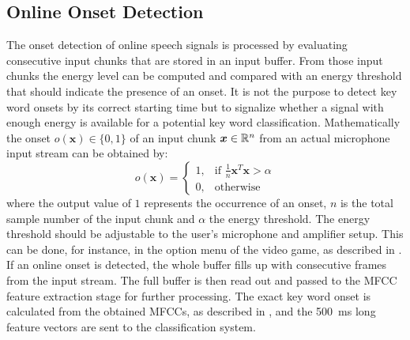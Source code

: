 
\subsection{Online Onset Detection}\label{sec:signal_onset_online}
The onset detection of online speech signals is processed by evaluating consecutive input chunks that are stored in an input buffer.
From those input chunks the energy level can be computed and compared with an energy threshold that should indicate the presence of an onset.
It is not the purpose to detect key word onsets by its correct starting time but to signalize whether a signal with enough energy is available for a potential key word classification.
Mathematically the onset $o(\bm{x}) \in \{0, 1\}$ of an input chunk $\bm{x} \in \mathbb{R}^n$ from an actual microphone input stream can be obtained by:
\begin{equation}
  o(\bm{x}) = 
  \begin{cases}
    1, & \text{if } \frac{1}{n} \bm{x}^T \bm{x} > \alpha\\
    0, & \text{otherwise} 
  \end{cases}
\end{equation}
where the output value of $1$ represents the occurrence of an onset, $n$ is the total sample number of the input chunk and $\alpha$ the energy threshold.
The energy threshold should be adjustable to the user's microphone and amplifier setup. 
This can be done, for instance, in the option menu of the video game, as described in .
If an online onset is detected, the whole buffer fills up with consecutive frames from the input stream.
The full buffer is then read out and passed to the MFCC feature extraction stage for further processing.
The exact key word onset is calculated from the obtained MFCCs, as described in , and the \SI{500}{\milli\second} long feature vectors are sent to the classification system.